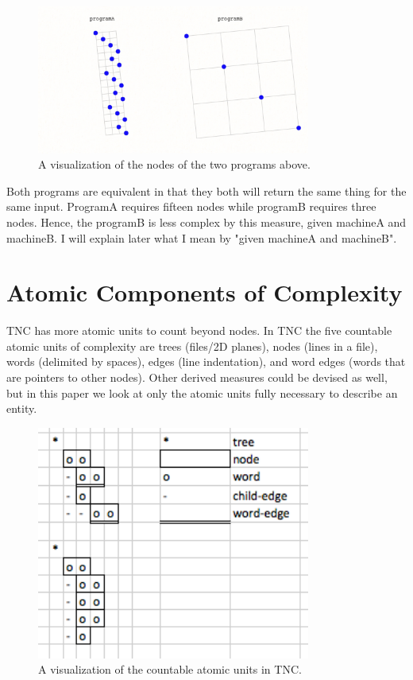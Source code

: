 \documentclass[journal]{IEEEtran}
\begin{document}
\begin{figure}[ht!]
\centering
\includegraphics[width=90mm]{programs.png}
\caption{A visualization of the nodes of the two programs above.}
\end{figure}

Both programs are equivalent in that they both will return the same thing for the same input. ProgramA requires fifteen nodes while programB requires three nodes. Hence, the programB is less complex by this measure, given machineA and machineB. I will explain later what I mean by "given machineA and machineB".

\section{Atomic Components of Complexity}

TNC has more atomic units to count beyond nodes. In TNC the five countable atomic units of complexity are trees (files/2D planes), nodes (lines in a file), words (delimited by spaces), edges (line indentation), and word edges (words that are pointers to other nodes). Other derived measures could be devised as well, but in this paper we look at only the atomic units fully necessary to describe an entity.

\begin{figure}[ht!]
\centering
\includegraphics[width=90mm]{atomicUnits.png}
\caption{A visualization of the countable atomic units in TNC.}
\end{figure}
\end{document}
